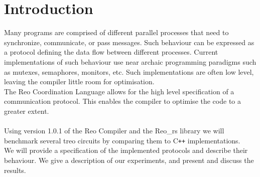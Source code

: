 \section{Introduction}
Many programs are comprised of different parallel processes that need to synchronize, communicate, or pass messages. Such behaviour can be expressed as a protocol defining the data flow between different processes. Current implementations of such behaviour use near archaic programming paradigms such as mutexes, semaphores, monitors, etc. Such implementations are often low level, leaving the compiler little room for optimisation. \\
The Reo Coordination Language \cite{reo} allows for the high level specification of a communication protocol. This enables the compiler to optimise the code to a greater extent. \\\\
%
Using version 1.0.1 of the Reo Compiler \cite{reo:git} and the Reo\_rs library \cite{reors:git} we will benchmark several treo circuits by comparing them to C\texttt{++} implementations.\\
We will provide a specification of the implemented protocols and describe their behaviour. We give a description of our experiments, and present and discuss the results.